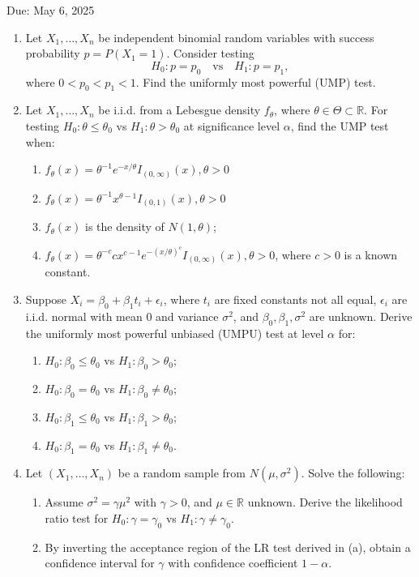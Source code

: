 Due: May 6, 2025

\begin{enumerate}
    \item Let \(X_1, \ldots, X_n\) be independent binomial random variables with success probability \(p = P(X_1 = 1)\). Consider testing
    \[
    H_0: p = p_0 \quad \text{vs} \quad H_1: p = p_1,
    \]
    where \(0 < p_0 < p_1 < 1\). Find the uniformly most powerful (UMP) test.

    \item Let \(X_1, \ldots, X_n\) be i.i.d. from a Lebesgue density \(f_\theta\), where \(\theta \in \Theta \subset \mathbb{R}\). For testing \(H_0: \theta \leq \theta_0\) vs \(H_1: \theta > \theta_0\) at significance level \(\alpha\), find the UMP test when:
    \begin{enumerate}
        \item \(f_\theta(x) = \theta^{-1} e^{-x/\theta} I_{(0, \infty)}(x), \theta > 0\)
        \item \(f_\theta(x) = \theta^{-1} x^{\theta - 1} I_{(0, 1)}(x), \theta > 0\)
        \item \(f_\theta(x)\) is the density of \(N(1, \theta)\);
        \item \(f_\theta(x) = \theta^{-c} c x^{c-1} e^{-(x/\theta)^c} I_{(0, \infty)}(x), \theta > 0\), where \(c > 0\) is a known constant.
    \end{enumerate}

    \item Suppose \(X_i = \beta_0 + \beta_1 t_i + \epsilon_i\), where \(t_i\) are fixed constants not all equal, \(\epsilon_i\) are i.i.d. normal with mean 0 and variance \(\sigma^2\), and \(\beta_0, \beta_1, \sigma^2\) are unknown. Derive the uniformly most powerful unbiased (UMPU) test at level \(\alpha\) for:
    \begin{enumerate}
        \item \(H_0: \beta_0 \leq \theta_0\) vs \(H_1: \beta_0 > \theta_0\);
        \item \(H_0: \beta_0 = \theta_0\) vs \(H_1: \beta_0 \neq \theta_0\);
        \item \(H_0: \beta_1 \leq \theta_0\) vs \(H_1: \beta_1 > \theta_0\);
        \item \(H_0: \beta_1 = \theta_0\) vs \(H_1: \beta_1 \neq \theta_0\).
    \end{enumerate}

    \item Let \((X_1, \ldots, X_n)\) be a random sample from \(N(\mu, \sigma^2)\). Solve the following:
    \begin{enumerate}
        \item Assume \(\sigma^2 = \gamma \mu^2\) with \(\gamma > 0\), and \(\mu \in \mathbb{R}\) unknown. Derive the likelihood ratio test for \(H_0: \gamma = \gamma_0\) vs \(H_1: \gamma \neq \gamma_0\).
        \item By inverting the acceptance region of the LR test derived in (a), obtain a confidence interval for \(\gamma\) with confidence coefficient \(1 - \alpha\).
    \end{enumerate}


\end{enumerate}
